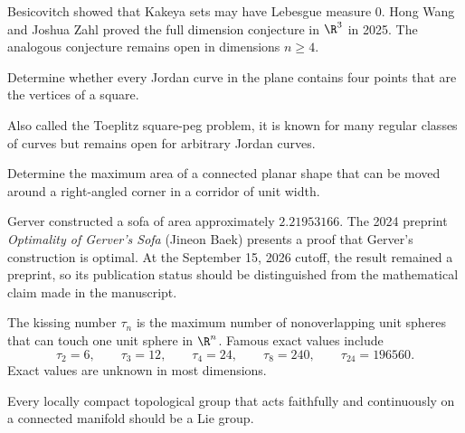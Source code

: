     \begin{remark}
        Besicovitch showed that Kakeya sets may have Lebesgue measure $0$.
        Hong Wang and Joshua Zahl proved the full dimension conjecture in
        $\R^3$ in 2025. The analogous conjecture remains open in dimensions
        $n\geq 4$.
    \end{remark}

    \begin{openproblem}
        Determine whether every Jordan curve in the plane contains four points
        that are the vertices of a square.
    \end{openproblem}

    \begin{remark}
        Also called the Toeplitz square-peg problem, it is known for many
        regular classes of curves but remains open for arbitrary Jordan curves.
    \end{remark}


    \begin{openproblem}
        Determine the maximum area of a connected planar shape that can be moved
        around a right-angled corner in a corridor of unit width.
    \end{openproblem}

    \begin{remark}
        Gerver constructed a sofa of area approximately $2.21953166$. The 2024
        preprint \textit{Optimality of Gerver's Sofa} (Jineon Baek) presents a
        proof that Gerver's construction is optimal. At the September 15, 2026
        cutoff, the result remained a preprint, so its publication
        status should
        be distinguished from the mathematical claim made in the manuscript.
    \end{remark}

    \begin{fact}
        The kissing number $\tau_n$ is the maximum number of nonoverlapping unit
        spheres that can touch one unit sphere in $\R^n$. Famous exact values
        include
        \[
            \tau_2=6,\qquad
            \tau_3=12,\qquad
            \tau_4=24,\qquad
            \tau_8=240,\qquad
            \tau_{24}=196560.
        \]
        Exact values are unknown in most dimensions.
    \end{fact}

    \begin{openproblem}
        Every locally compact topological group that acts faithfully and
        continuously on a connected manifold should be a Lie group.
    \end{openproblem}

